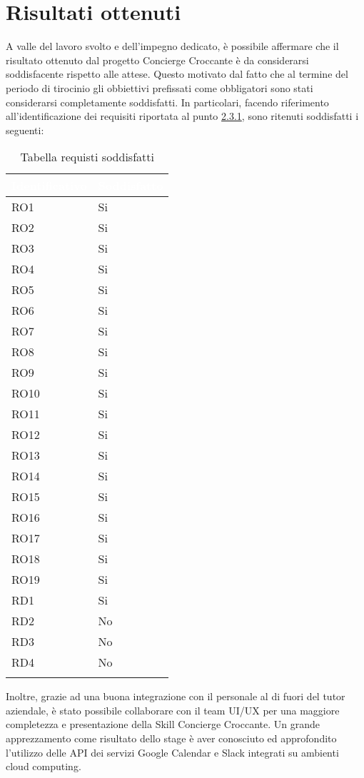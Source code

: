 \section{Risultati ottenuti}
A valle del lavoro svolto e dell'impegno dedicato, è possibile affermare che il risultato ottenuto dal progetto Concierge Croccante è da considerarsi soddisfacente rispetto alle attese. Questo motivato dal fatto che al termine del periodo di tirocinio gli obbiettivi prefissati come obbligatori sono stati considerarsi completamente soddisfatti. In particolari, facendo riferimento all'identificazione dei requisiti riportata al punto \hyperref[indentificazione-requisiti]{2.3.1}, sono ritenuti soddisfatti i seguenti:
\begin{center}
	\centering
	\renewcommand{\arraystretch}{1.5}
	\begin{longtable}{  p{2.5cm} p{2.5cm} }
		\rowcolor{tableHead}
		\textbf{\textcolor{white}{Identificativo}} & \textbf{\textcolor{white}{Soddisfatto}} \\
		\endhead  
		RO1 & Si \\
		RO2 & Si \\ 
		RO3 & Si \\
		RO4 & Si \\
		RO5 & Si \\
		RO6 & Si \\
		RO7 & Si \\
		RO8 & Si \\
		RO9 & Si \\
		RO10 & Si \\
		RO11 & Si \\
	    RO12 & Si \\
	    RO13 & Si \\
	    RO14 & Si \\
	    RO15 & Si \\
	    RO16 & Si \\
	    RO17 & Si \\
		RO18 & Si \\
		RO19 & Si \\
		RD1 & Si \\
		RD2 & No \\
		RD3 & No \\
		RD4 & No \\
		\rowcolor{white}
		\caption{Tabella requisti soddisfatti}
	\end{longtable}
\end{center}
Inoltre, grazie ad una buona integrazione con il personale al di fuori del tutor aziendale, è stato possibile collaborare con il team UI/UX per una maggiore completezza e presentazione della Skill Concierge Croccante.
Un grande apprezzamento come risultato dello stage è aver conosciuto ed approfondito l'utilizzo delle API dei servizi Google Calendar e Slack integrati su ambienti cloud computing.

